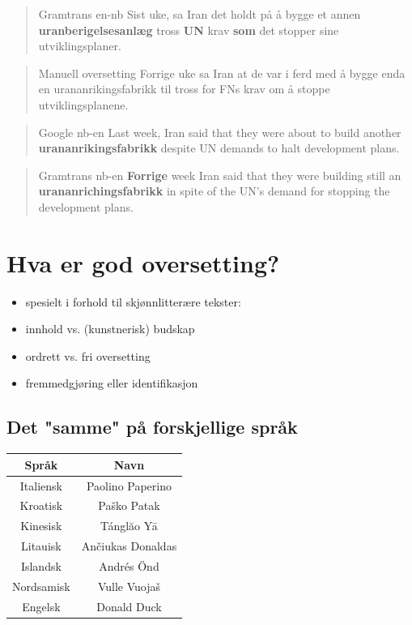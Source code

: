 \documentclass[a4paper,english,12pt]{article}
\begin{document}
\begin{spacing}{1.0}
\begin{quote}{Gramtrans en-nb}
Sist uke, sa Iran det holdt på å bygge et annen \textbf{uranberigelsesanlæg} tross \textbf{UN} krav \textbf{som} det stopper sine utviklingsplaner.
\end{quote}

\begin{quote}{Manuell oversetting}
Forrige uke sa Iran at de var i ferd med å bygge enda en urananrikingsfabrikk til tross for FNs krav om å stoppe utviklingsplanene.
\end{quote}

 
\begin{quote}{Google nb-en}
Last week, Iran said that they were about to build another \textbf{urananrikingsfabrikk} despite UN demands to halt development plans.
\end{quote}

\begin{quote}{Gramtrans nb-en}
\textbf{Forrige} week Iran said that they were building still an \textbf{urananrichingsfabrikk} in spite of the UN's demand for stopping the development plans.
\end{quote}

 

\section{Hva er god oversetting?} 
\begin{itemize}
\item spesielt i forhold til skjønnlitterære tekster:
\item innhold vs. (kunstnerisk) budskap
\item ordrett vs. fri oversetting 
\item fremmedgjøring eller identifikasjon 
\end{itemize} 
 

\subsection{Det "samme" på forskjellige språk}
\begin{tabular}{|c|c|}
\hline
\textbf{Språk} & \textbf{Navn} \\
\hline
Italiensk &  Paolino Paperino  \\
\hline
Kroatisk &  Paško Patak  \\
\hline
Kinesisk & Tánglăo Yā \\
\hline
Litauisk & Ančiukas Donaldas \\
\hline
Islandsk & Andrés Önd \\
\hline
Nordsamisk & Vulle Vuojaš \\
\hline
Engelsk & Donald Duck \\
\hline
\end{tabular}
 


\end{spacing}
\end{document}
